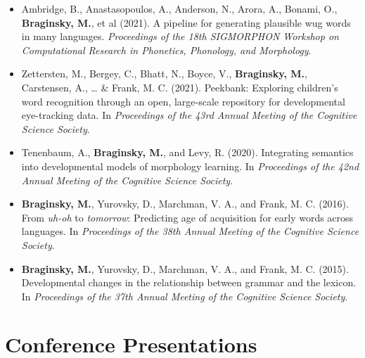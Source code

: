 \documentclass[11pt,]{article}
\begin{document}
\begin{itemize}
\item
  Ambridge, B., Anastasopoulos, A., Anderson, N., Arora, A., Bonami, O.,
  \textbf{Braginsky, M.}, et al (2021). A pipeline for generating
  plausible wug words in many languages. \emph{Proceedings of the 18th
  SIGMORPHON Workshop on Computational Research in Phonetics, Phonology,
  and Morphology}.
\item
  Zettersten, M., Bergey, C., Bhatt, N., Boyce, V., \textbf{Braginsky,
  M.}, Carstensen, A., \ldots{} \& Frank, M. C. (2021). Peekbank:
  Exploring children's word recognition through an open, large-scale
  repository for developmental eye-tracking data. In \emph{Proceedings
  of the 43rd Annual Meeting of the Cognitive Science Society}.
\item
  Tenenbaum, A., \textbf{Braginsky, M.}, and Levy, R. (2020).
  Integrating semantics into developmental models of morphology
  learning. In \emph{Proceedings of the 42nd Annual Meeting of the
  Cognitive Science Society}.
\item
  \textbf{Braginsky, M.}, Yurovsky, D., Marchman, V. A., and Frank, M.
  C. (2016). From \emph{uh-oh} to \emph{tomorrow}: Predicting age of
  acquisition for early words across languages. In \emph{Proceedings of
  the 38th Annual Meeting of the Cognitive Science Society}.
\item
  \textbf{Braginsky, M.}, Yurovsky, D., Marchman, V. A., and Frank, M.
  C. (2015). Developmental changes in the relationship between grammar
  and the lexicon. In \emph{Proceedings of the 37th Annual Meeting of
  the Cognitive Science Society}.
\end{itemize}

\section{Conference Presentations}\label{conference-presentations}
\end{document}
